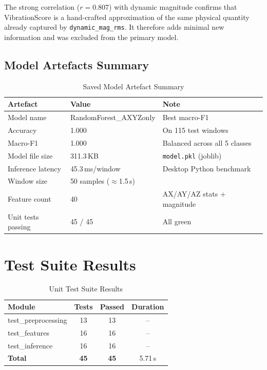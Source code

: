 \documentclass[12pt,a4paper]{report}
\begin{document}
The strong correlation ($r = 0.807$) with dynamic magnitude confirms that
VibrationScore is a hand-crafted approximation of the same physical quantity
already captured by \texttt{dynamic\_mag\_rms}. It therefore adds minimal
new information and was excluded from the primary model.

\subsection{Model Artefacts Summary}

\begin{table}[H]
  \centering
  \caption{Saved Model Artefact Summary}
  \label{tab:artefacts}
  \begin{tabular}{lll}
    \toprule
    \textbf{Artefact} & \textbf{Value} & \textbf{Note} \\
    \midrule
    Model name          & RandomForest\_AXYZonly & Best macro-F1 \\
    Accuracy            & 1.000 & On 115 test windows \\
    Macro-F1            & 1.000 & Balanced across all 5 classes \\
    Model file size     & 311.3\,KB & \texttt{model.pkl} (joblib) \\
    Inference latency   & 45.3\,ms/window & Desktop Python benchmark \\
    Window size         & 50 samples ($\approx$1.5\,s) & \\
    Feature count       & 40 & AX/AY/AZ stats + magnitude \\
    Unit tests passing  & 45 / 45 & All green \\
    \bottomrule
  \end{tabular}
\end{table}

\section{Test Suite Results}

\begin{table}[H]
  \centering
  \caption{Unit Test Suite Results}
  \label{tab:tests}
  \begin{tabular}{lccc}
    \toprule
    \textbf{Module} & \textbf{Tests} & \textbf{Passed} & \textbf{Duration} \\
    \midrule
    test\_preprocessing & 13 & 13 & -- \\
    test\_features      & 16 & 16 & -- \\
    test\_inference     & 16 & 16 & -- \\
    \midrule
    \textbf{Total}      & \textbf{45} & \textbf{45} & 5.71\,s \\
    \bottomrule
  \end{tabular}
\end{table}
\end{document}
